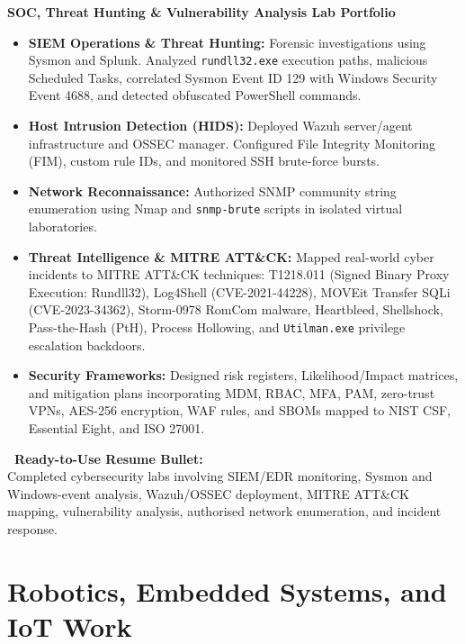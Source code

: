 \documentclass[10pt,a4paper]{article}
\newcommand{\statuscompleted}{\tcbox[on line, colback=completedbg, colframe=completed!50!white, size=small, arc=2pt, boxrule=0.5pt]{\scriptsize\bfseries\color{completed}\faIcon{check-circle}\ COMPLETED / SUBSTANTIAL}}
\begin{document}
\begin{projectcard}
  \textbf{SOC, Threat Hunting \& Vulnerability Analysis Lab Portfolio} \hfill \statuscompleted\\[2pt]
  \begin{itemize}[leftmargin=14pt, itemsep=1.5pt, topsep=2pt]
    \item \textbf{SIEM Operations \& Threat Hunting:} Forensic investigations using Sysmon and Splunk. Analyzed \texttt{rundll32.exe} execution paths, malicious Scheduled Tasks, correlated Sysmon Event ID 129 with Windows Security Event 4688, and detected obfuscated PowerShell commands.
    \item \textbf{Host Intrusion Detection (HIDS):} Deployed Wazuh server/agent infrastructure and OSSEC manager. Configured File Integrity Monitoring (FIM), custom rule IDs, and monitored SSH brute-force bursts.
    \item \textbf{Network Reconnaissance:} Authorized SNMP community string enumeration using Nmap and \texttt{snmp-brute} scripts in isolated virtual laboratories.
    \item \textbf{Threat Intelligence \& MITRE ATT\&CK:} Mapped real-world cyber incidents to MITRE ATT\&CK techniques: T1218.011 (Signed Binary Proxy Execution: Rundll32), Log4Shell (CVE-2021-44228), MOVEit Transfer SQLi (CVE-2023-34362), Storm-0978 RomCom malware, Heartbleed, Shellshock, Pass-the-Hash (PtH), Process Hollowing, and \texttt{Utilman.exe} privilege escalation backdoors.
    \item \textbf{Security Frameworks:} Designed risk registers, Likelihood/Impact matrices, and mitigation plans incorporating MDM, RBAC, MFA, PAM, zero-trust VPNs, AES-256 encryption, WAF rules, and SBOMs mapped to NIST CSF, Essential Eight, and ISO 27001.
  \end{itemize}
  \begin{resumebox}
    \textbf{\color{accent}\ Ready-to-Use Resume Bullet:}\\
    Completed cybersecurity labs involving SIEM/EDR monitoring, Sysmon and Windows-event analysis, Wazuh/OSSEC deployment, MITRE ATT\&CK mapping, vulnerability analysis, authorised network enumeration, and incident response.
  \end{resumebox}
\end{projectcard}

\section{Robotics, Embedded Systems, and IoT Work}
\end{document}
